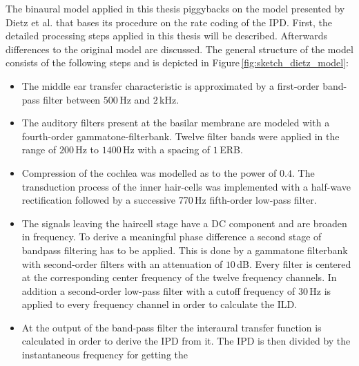 The binaural model applied in this thesis piggybacks on the model presented by
Dietz et al.\autocite{Dietz2011} that bases its procedure on the rate coding of
the \ac{IPD}. First, the detailed processing steps applied in this thesis will be
described. Afterwards differences to the original model are discussed. The general
structure of the model consists of the following steps and is depicted in
Figure\,\ref{fig:sketch_dietz_model}:
\begin{itemize}
    \item The middle ear transfer characteristic is approximated by a
        first-order band-pass filter between $500$\,Hz and
        $2$\,kHz.\autocite{Puria2003}
    \item The auditory filters present at the basilar membrane are modeled with
        a fourth-order gammatone-filterbank.\autocite{Hohmann2002}
        Twelve filter bands were applied in the range of $200$\,Hz to $1400$\,Hz
        with a spacing of $1$\,ERB.
    \item Compression of the cochlea was
        modelled as to the power of $0.4$.\autocite{Ewert2000,Ruggero1997}
        The transduction process of the inner
        hair-cells was implemented with a half-wave rectification followed by a
        successive 770\,Hz fifth-order low-pass filter.\autocite{Breebaart2001}
    \item The signals leaving the haircell stage have a DC component and are
        broaden in frequency. To derive a meaningful phase difference a second
        stage of bandpass filtering has to be applied. This is done by a
        gammatone filterbank with second-order filters with an attenuation of
        $10$\,dB. Every filter is centered at the corresponding center frequency
        of the twelve frequency channels. In addition a second-order low-pass
        filter with a cutoff frequency of $30$\,Hz is applied to every frequency
        channel in order to calculate the \ac{ILD}.
    \item At the output of the band-pass filter the interaural transfer function
        is calculated in order to derive the \ac{IPD} from it. The
        \ac{IPD} is then divided by the instantaneous frequency for getting the

\end{itemize}
